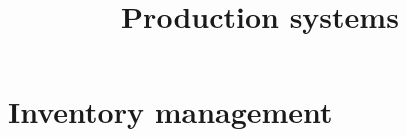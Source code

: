 \documentclass{report}
\title{Production systems}
\begin{document}
\maketitle
\tableofcontents



\chapter{Inventory management}

\end{document}
